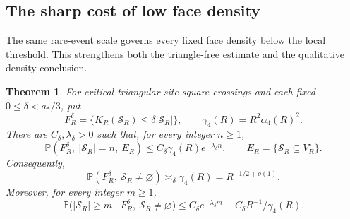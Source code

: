 \documentclass[11pt]{amsart}
\newtheorem{theorem}{Theorem}[section]
\theoremstyle{remark}
\newcommand{\Prob}{\mathbb P}
\newcommand{\cS}{\mathcal S}
\newcommand{\astar}{a_*}
\begin{document}
\subsection{The sharp cost of low face density}\label{sec:lowdensity}

The same rare-event scale governs every fixed face density below the local threshold. This strengthens both the triangle-free estimate and the qualitative density conclusion.

\begin{theorem}\label{thm:lowdensity}
For critical triangular-site square crossings and each fixed $0\le\delta<\astar/3$, put
\[
 F_R^\delta=\{K_R(\cS_R)\le\delta|\cS_R|\},\qquad
 \gamma_4(R)=R^2\alpha_4(R)^2.
\]
There are $C_\delta,\lambda_\delta>0$ such that, for every integer $n\ge1$,
\begin{equation}\label{eq:lowdensity_size}
 \Prob(F_R^\delta,\ |\cS_R|=n,\ E_R)
 \le C_\delta\gamma_4(R)e^{-\lambda_\delta n},
 \qquad E_R=\{\cS_R\subseteq V_R^\circ\}.
\end{equation}
Consequently,
\begin{equation}\label{eq:lowdensity_mass}
 \Prob(F_R^\delta,\ \cS_R\ne\varnothing)
 \asymp_\delta\gamma_4(R)=R^{-1/2+o(1)}.
\end{equation}
Moreover, for every integer $m\ge1$,
\[
 \Prob\bigl(|\cS_R|\ge m\mid F_R^\delta,\ \cS_R\ne\varnothing\bigr)
 \le C_\delta e^{-\lambda_\delta m}+C_\delta R^{-1}/\gamma_4(R).
\]
\end{theorem}
\end{document}
